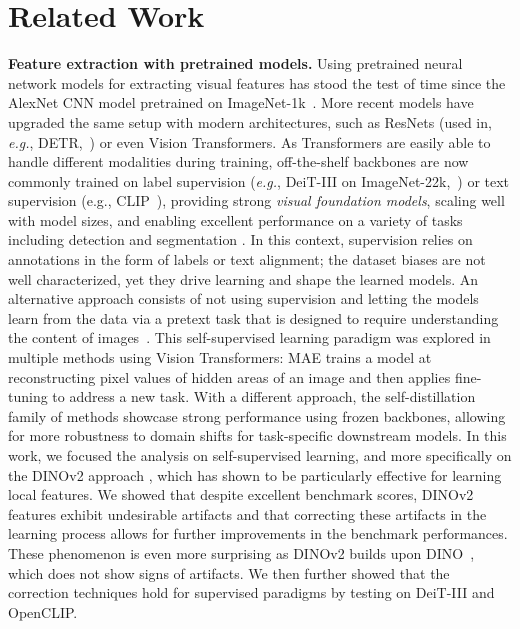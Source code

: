 \section{Related Work}
\textbf{Feature extraction with pretrained models.}
Using pretrained neural network models for extracting visual features  has stood the test of time  since the AlexNet \citep{alexnet} CNN model pretrained on ImageNet-1k~\citep{russakovsky2015imagenet}. 
More recent models have upgraded the same setup with modern architectures, such as ResNets (used in, \emph{e.g.}, DETR,~\citealp{carion2020end}) or even Vision Transformers. 
As Transformers are easily able to handle different modalities during training, off-the-shelf backbones are now commonly trained on label supervision (\emph{e.g.}, DeiT-III on ImageNet-22k,~\citealp{touvron2022deit}) or text supervision (e.g., CLIP~\citep{radford2021learning}), providing strong \textit{visual foundation models}, scaling well with model sizes, and enabling excellent performance on a variety of tasks including detection \citep{carion2020end} and segmentation \citep{zheng2021rethinking,kirillov2023segment}.
In this context, supervision relies on annotations in the form of labels or text alignment; the dataset biases \citep{torralba2014dataset} are not well characterized, yet they drive learning and shape the learned models. 
An alternative approach consists of not using supervision and letting the models learn from the data via a pretext task that is designed to require understanding the content of images~\citep{doersch2015unsupervised}. 
This self-supervised learning paradigm was explored in multiple methods using Vision Transformers: MAE \citep{he2021masked} trains a model at reconstructing pixel values of hidden areas of an image and then applies fine-tuning to address a new task. 
With a different approach, the self-distillation family of methods \citep{he2020momentum, caron2021emerging, zhou2021ibot} showcase strong performance using frozen backbones, allowing for more robustness to domain shifts for task-specific downstream models.
In this work, we focused the analysis on self-supervised learning, and more specifically on the DINOv2 approach \citep{oquab2023dinov2}, which has shown to be particularly effective for learning local features.
We showed that despite excellent benchmark scores, DINOv2 features exhibit undesirable artifacts and that correcting these artifacts in the learning process allows for further improvements in the benchmark performances.
These phenomenon is even more surprising as DINOv2 builds upon DINO~\citep{caron2021emerging}, which does not show signs of artifacts.
We then further showed that the correction techniques hold for supervised paradigms by testing on DeiT-III and OpenCLIP.

